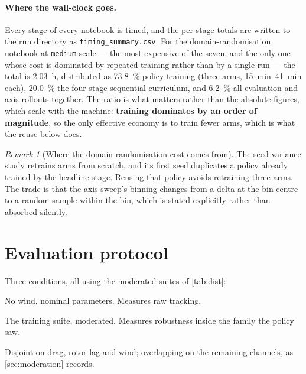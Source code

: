 \documentclass[11pt,a4paper,twoside,openright]{report}
\makeatletter
\renewcommand{\subsection}{\FloatBarrier\old@subsection}}
\theoremstyle{plain}
\theoremstyle{definition}
\theoremstyle{remark}
\newtheorem{remark}[theorem]{Remark}
\makeatother
\begin{document}
	\paragraph{Where the wall-clock goes.} Every stage of every notebook is
	timed, and the per-stage totals are written to the run directory as
	\texttt{timing\_summary.csv}. For the
	domain-randomisation notebook at \texttt{medium} scale --- the most
	expensive of the seven, and the only one whose cost is dominated by repeated
	training rather than by a single run --- the total is \SI{2.03}{\hour},
	distributed as
	\SI{73.8}{\percent} policy training (three arms, \SIrange{15}{41}{\minute}
	each), \SI{20.0}{\percent} the four-stage sequential curriculum, and
	\SI{6.2}{\percent} all evaluation and axis rollouts together. The ratio is
	what matters rather than the absolute figures, which scale with the machine:
	\textbf{training dominates by an order of magnitude}, so the only effective
	economy is to train fewer arms, which is what the reuse below does.


	\begin{remark}[Where the domain-randomisation cost comes from]
		The seed-variance study retrains arms from scratch, and its first seed
		duplicates a policy already trained by the headline stage. Reusing that policy
		avoids retraining three arms. The trade is that the axis sweep's binning
		changes from a delta at the bin centre to a random sample within the bin, which
		is stated explicitly rather than absorbed silently.
	\end{remark}

	\section{Evaluation protocol}

	\subsection{Conditions}

	Three conditions, all using the moderated suites of \cref{tab:dist}:

	\begin{description}[nosep,leftmargin=*,style=nextline]
		\item[S1 --- nominal.] No wind, nominal parameters. Measures raw tracking.
		\item[S2 --- in distribution.] The training suite, moderated. Measures
		robustness inside the family the policy saw.
		\item[S3 --- out of distribution.] Disjoint on drag, rotor lag and wind;
		overlapping on the remaining channels, as \cref{sec:moderation} records.
	\end{description}
\end{document}
